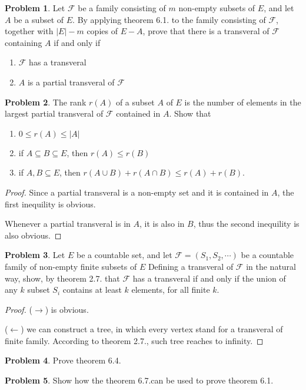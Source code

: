 \documentclass[a4paper,11pt]{article}%
\theoremstyle{remark}
\theoremstyle{definition}
\newtheorem{problem}{Problem}[subsection]
\newcommand*{\abs}[1]{\lvert #1 \rvert}
\begin{document}
\begin{problem}
    Let $\mathcal{F}$ be a family consisting of $m$ non-empty subsets of $E$, and let $A$ be a subset of $E$.
    By applying theorem 6.1. to the family consisting of $\mathcal{F}$, together with $\abs{E}-m$ copies of $E-A$,
    prove that there is a transveral of $\mathcal{F}$ containing $A$ if and only if 
    \begin{enumerate}
        \item $\mathcal{F}$ has a transveral
        \item $A$ is a partial transveral of $\mathcal{F}$
    \end{enumerate}
\end{problem}
\begin{problem}
    The rank $r(A)$ of a subset $A$ of $E$ is the number of elements in the largest partial transveral of $\mathcal{F}$ contained in $A$.
    Show that 
    \begin{enumerate}
        \item $0\leq r(A)\leq\abs{A}$
        \item if $A\subseteq B\subseteq E$, then $r(A)\leq r(B)$
        \item if $A,B\subseteq E$, then $r(A\cup B)+r(A\cap B)\leq r(A)+r(B)$.
    \end{enumerate}
    \begin{proof}
            Since a partial transveral is a non-empty set and it is contained in $A$, the first inequility is obvious.

            Whenever a partial transveral is in $A$, it is also in $B$, thus the second inequility is also obvious.

    \end{proof}
\end{problem}
\begin{problem}
    Let $E$ be a countable set, and let $\mathcal{F}=(S_1,S_2,\cdots)$ be a countable family of non-empty finite subsets of $E$
    Defining a transveral of $\mathcal{F}$ in the natural way, show, by theorem 2.7. that $\mathcal{F}$ has a transveral
    if and only if the union of any $k$ subset $S_i$ contains at least $k$ elements, for all finite $k$.
    \begin{proof}
       ($\rightarrow$) is obvious.
       
       ($\leftarrow$) we can construct a tree, in which every vertex stand for a transveral of finite family. 
       According to theorem 2.7., such tree reaches to infinity.
    \end{proof}
\end{problem}
\begin{problem}
    Prove theorem 6.4.
\end{problem}
\begin{problem}
    Show how the theorem 6.7.can be used to prove theorem 6.1.
\end{problem}
\end{document}
